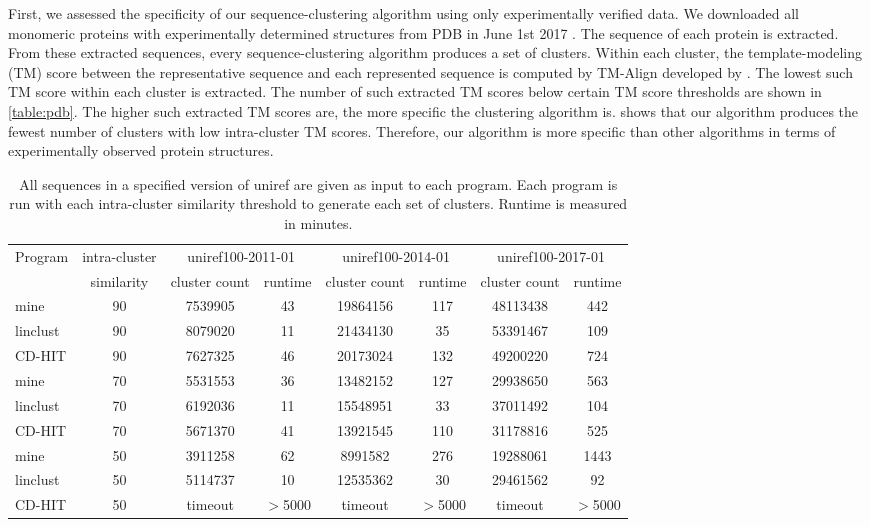 \documentclass[]{article}
\begin{document}
First, we assessed the specificity of our sequence-clustering algorithm using only experimentally verified data.
We downloaded all monomeric proteins with experimentally determined structures from PDB in June 1st 2017 \cite{bank1971protein}.
The sequence of each protein is extracted.
From these extracted sequences, every sequence-clustering algorithm produces a set of clusters.
Within each cluster, the template-modeling (TM) score between the representative sequence and each represented sequence is computed by TM-Align developed by \citet{zhang2005tm}.
The lowest such TM score within each cluster is extracted.
The number of such extracted TM scores below certain TM score thresholds are shown in \cref{table:pdb}.
The higher such extracted TM scores are, the more specific the clustering algorithm is. 
 shows that our algorithm produces the fewest number of clusters with low intra-cluster TM scores.
Therefore, our algorithm is more specific than other algorithms in terms of experimentally observed protein structures.

\begin{table}%
	\centering
	\caption{
		All sequences in a specified version of uniref are given as input to each program. 
		Each program is run with each intra-cluster similarity threshold to generate each set of clusters.
		Runtime is measured in minutes.
	}
	\begin{tabular}{l c c c c c c c}
		\toprule
		Program & intra-cluster & \multicolumn{2}{c}{uniref100-2011-01}
		& \multicolumn{2}{c}{uniref100-2014-01}
		& \multicolumn{2}{c}{uniref100-2017-01} \\ 
		& similarity    & cluster count & runtime
		& cluster count & runtime
		& cluster count & runtime \\
		\midrule
		mine     & 90 & 7539905 & 43 & 19864156 & 117 & 48113438 & 442 \\
		linclust & 90 & 8079020 & 11 & 21434130 & 35  & 53391467 & 109 \\
		CD-HIT   & 90 & 7627325 & 46 & 20173024 & 132 & 49200220 & 724 \\
		
		mine     & 70 & 5531553 & 36 & 13482152 & 127 & 29938650 & 563 \\
		linclust & 70 & 6192036 & 11 & 15548951 & 33  & 37011492 & 104 \\
		CD-HIT   & 70 & 5671370 & 41 & 13921545 & 110 & 31178816 & 525 \\
		
		mine     & 50 & 3911258 & 62 & 8991582  & 276 & 19288061 & 1443 \\
		linclust & 50 & 5114737 & 10 & 12535362 & 30  & 29461562  & 92 \\
		CD-HIT   & 50 & timeout & \(>\)5000 & timeout & \(>\)5000 & timeout & \(>\)5000 \\
		\bottomrule
	\end{tabular}
	\label{table:uniref}
\end{table}
\end{document}
